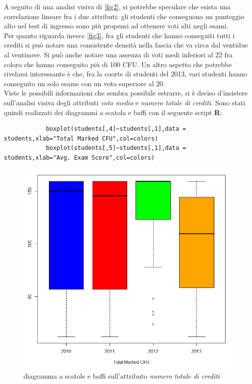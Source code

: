             A seguito di una analisi visiva di \ref{fig2}, si potrebbe speculare che esista una correlazione lineare fra i due attributi: gli studenti che conseguono un punteggio alto nel test di ingresso sono più propensi ad ottenere voti alti negli esami. \\

            Per quanto riguarda invece \ref{fig3}, fra gli studenti che hanno conseguiti tutti i crediti si può notare una consistente densità nella fascia che va circa dal ventidue al ventinove. Si può anche notare una assenza di voti medi inferiori al 22 fra coloro che hanno conseguito più di 100 CFU. Un altro aspetto che potrebbe rivelarsi interessante è che, fra la coorte di studenti del 2013, vari studenti hanno conseguito un solo esame con un voto superiore al 20. \\

            Viste le possibili informazioni che sembra possibile estrarre, si è deciso d'insistere sull’analisi visiva degli attributi \textit{voto medio} e \textit{numero totale di crediti}. Sono stati quindi realizzati dei diagrammi a scatola e baffi con il seguente script \textbf{R}: 

            \begin{lstlisting}
            boxplot(students[,4]~students[,1],data = students,xlab="Total Marked CFU",col=colors)
            boxplot(students[,5]~students[,1],data = students,xlab="Avg. Exam Score",col=colors)
            \end{lstlisting}

            \begin{figure}
                \centering
                \caption{diagramma a scatole e baffi sull'attributo \textit{numero totale di crediti}}
                \label{boxplot1}
            	\includegraphics[scale=0.5]{img/box_plot_1.png}
            \end{figure}

